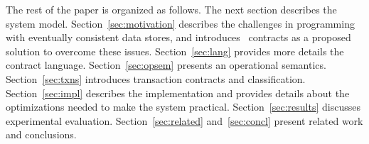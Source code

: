 The rest of the paper is organized as follows. The next section describes
the system model. Section~\ref{sec:motivation} describes the challenges in
programming with eventually consistent data stores, and introduces
\name\ contracts as a proposed solution to overcome these issues.
Section~\ref{sec:lang} provides more details the contract language.
Section~\ref{sec:opsem} presents an operational semantics.
Section~\ref{sec:txns} introduces transaction contracts and classification.
Section~\ref{sec:impl} describes the implementation and provides details 
about the optimizations needed to make the system practical.
Section~\ref{sec:results} discusses experimental evaluation.
Section~\ref{sec:related} and~\ref{sec:concl} present related work and
conclusions.
